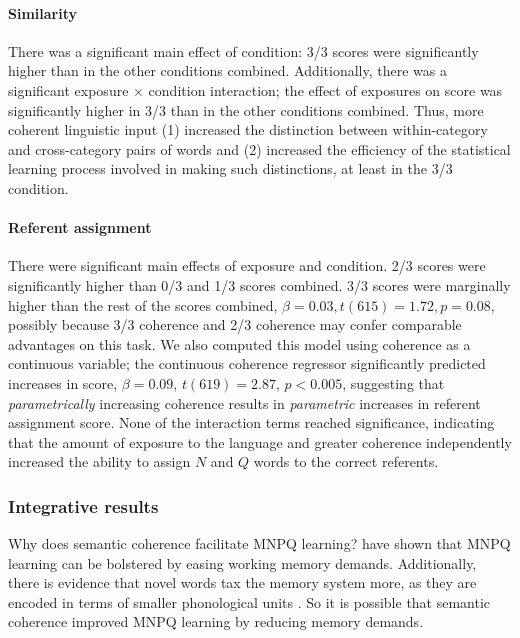 \documentclass[man,floatsintext]{apa6}
\begin{document}
\paragraph{Similarity} There was a significant main effect of condition: 3/3 scores were significantly higher than in the other conditions combined. Additionally, there was a significant exposure $\times$ condition interaction; the effect of exposures on score was significantly higher in 3/3 than in the other conditions combined. Thus, more coherent linguistic input (1) increased the distinction between within-category and cross-category pairs of words and (2) increased the efficiency of the statistical learning process involved in making such distinctions, at least in the 3/3 condition.

\paragraph{Referent assignment}

There were significant main effects of exposure and condition. 2/3 scores were significantly higher than 0/3 and 1/3 scores combined. 3/3 scores were marginally higher than the rest of the scores combined, $\beta = 0.03, t(615) = 1.72, p = 0.08$, possibly because 3/3 coherence and 2/3 coherence may confer comparable advantages on this task. We also computed this model using coherence as a continuous variable; the continuous coherence regressor significantly predicted increases in score, $\beta = 0.09$, $t(619) = 2.87$, $p < 0.005$, suggesting that \emph{parametrically} increasing coherence results in \emph{parametric} increases in referent assignment score. None of the interaction terms reached significance, indicating that the amount of exposure to the language and greater coherence independently increased the ability to assign $N$ and $Q$ words to the correct referents.


\subsubsection{Integrative results} Why does semantic coherence facilitate MNPQ learning? \citet{frank2011} have shown that MNPQ learning can be bolstered by easing working memory demands. Additionally, there is evidence that novel words tax the memory system more, as they are encoded in terms of smaller phonological units \citep{treiman1988}. So it is possible that semantic coherence improved MNPQ learning by reducing memory demands.
\end{document}
